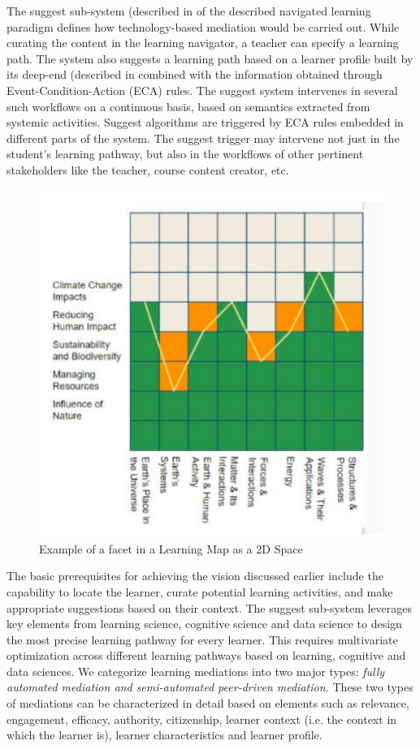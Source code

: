 \begin{multicols}{2}
The suggest sub-system (described in \cite{art2-key28} of the described navigated learning paradigm defines how technology-based mediation would be carried out. While curating the content in the learning navigator, a teacher can specify a learning path. The system also suggests a learning path based on a learner profile built by its deep-end (described in \cite{art2-key28} combined with the information obtained through Event-Condition-Action (ECA) rules. The suggest system intervenes in several such workflows on a continuous basis, based on semantics extracted from systemic activities. Suggest algorithms are triggered by ECA rules embedded in different parts of the system. The suggest trigger may intervene not just in the student’s learning pathway, but also in the workflows of other pertinent stakeholders like the teacher, course content creator, etc.
\begin{figure}[H]
\centering
\includegraphics{src/Figures/chap2/chap2-fig04.jpg}
\caption{Example of a facet in a Learning Map as a 2D Space}\label{chap2-fig04}
\end{figure}

The basic prerequisites for achieving the vision discussed earlier include the capability to locate the learner, curate potential learning activities, and make appropriate suggestions based on their context. The suggest sub-system leverages key elements from learning science, cognitive science and data science to design the most precise learning pathway for every learner. This requires multivariate optimization across different learning pathways based on learning, cognitive and data sciences. We categorize learning mediations into two major types: \textit{fully automated mediation and semi-automated peer-driven mediation.} These two types of mediations can be characterized in detail based on elements such as relevance, engagement, efficacy, authority, citizenship, learner context (i.e. the context in which the learner is), learner characteristics and learner profile.


\end{multicols}
